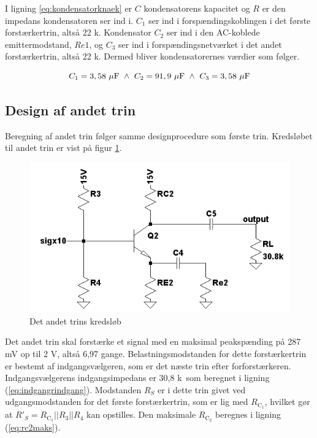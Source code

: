 I ligning \ref{eq:kondensatorknaek} er $C$ kondensatorens kapacitet og $R$ er den impedans kondensatoren ser ind i. $C_1$ ser ind i forspændingskoblingen i det første forstærkertrin, altså 22 k\ohm. Kondensator $C_2$ ser ind i den AC-koblede emittermodstand, $Re1$, og $C_3$ ser ind i forspændingsnetværket i det andet forstærkertrin, altså 22 k\ohm. Dermed bliver kondensatorernes værdier som følger.

\begin{equation}
C_1=3,58~\mathrm{\mu F}~\wedge ~C_2=91,9~\mathrm{\mu F}~\wedge ~C_3=3,58~\mathrm{\mu F}
\end{equation}



\subsection*{Design af andet trin}
Beregning af andet trin følger samme designprocedure som første trin. Kredsløbet til andet trin er vist på figur \ref{fig:andettrinkreds}.

\begin{figure}[h]
\centering
\includegraphics[scale=.6]{teknisk/forforstaerker/andettrinkreds.png}
\caption{Det andet trins kredsløb}
\label{fig:andettrinkreds}
\end{figure}

Det andet trin skal forstærke et signal med en maksimal peakspænding på 287 mV op til 2 V, altså 6,97 gange. Belastningsmodstanden for dette forstærkertrin er bestemt af indgangsvælgeren, som er det næste trin efter forforstærkeren. Indgangsvælgerens indgangsimpedans er 30,8 k\ohm~som beregnet i ligning (\ref{eq:indgangrindgang}). Modstanden $R_S$ er i dette trin givet ved udgangsmodstanden for det første forstærkertrin, som er lig med $R_{\mathrm{C_1}}$, hvilket gør at $R'_S = R_{\mathrm{C_1}} || R_3 || R_4$ kan opstilles. Den maksimale $R_{\mathrm{C_2}}$ beregnes i ligning (\ref{eq:rc2maks}).

